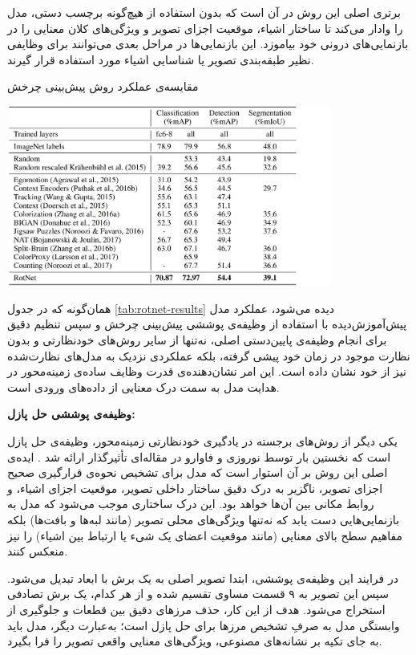 برتری اصلی این روش در آن است که بدون استفاده از هیچ‌گونه برچسب دستی، مدل را وادار می‌کند تا ساختار اشیاء، موقعیت اجزای تصویر و ویژگی‌های کلان معنایی را در بازنمایی‌های درونی خود بیاموزد. این بازنمایی‌ها در مراحل بعدی می‌توانند برای وظایفی نظیر طبقه‌بندی تصویر یا شناسایی اشیاء مورد استفاده قرار گیرند.

\begin{table}[htbp]
\centering
\caption{مقایسه‌ی عملکرد روش پیش‌بینی چرخش }
\includegraphics[width=0.8\textwidth]{Images/Chapter2/rotnet-results.png}
\label{tab:rotnet-results}
\end{table}

همان‌گونه که در جدول
\ref{tab:rotnet-results}
دیده می‌شود، عملکرد مدل پیش‌آموزش‌دیده با استفاده از وظیفه‌ی پوششی پیش‌بینی چرخش و سپس تنظیم دقیق برای انجام وظیفه‌ی پایین‌دستی اصلی، نه‌تنها از سایر روش‌های خودنظارتی و بدون نظارت موجود در زمان خود پیشی گرفته، بلکه عملکردی نزدیک به مدل‌های نظارت‌شده نیز از خود نشان داده است. این امر نشان‌دهنده‌ی قدرت وظایف ساده‌ی زمینه‌محور در هدایت مدل به سمت درک معنایی از داده‌های ورودی است.\newline

\noindent\textbf{وظیفه‌ی پوششی حل پازل:}

یکی دیگر از روش‌های برجسته در یادگیری خودنظارتی زمینه‌محور، وظیفه‌ی حل پازل است که نخستین بار توسط نوروزی و فاوارو در مقاله‌ای تأثیرگذار ارائه شد \cite{noroozi2016unsupervised}. ایده‌ی اصلی این روش بر آن استوار است که مدل برای تشخیص نحوه‌ی قرارگیری صحیح اجزای تصویر، ناگزیر به درک دقیق ساختار داخلی تصویر، موقعیت اجزای اشیاء، و روابط مکانی بین آن‌ها خواهد بود. این درک ساختاری موجب می‌شود که مدل به بازنمایی‌هایی دست یابد که نه‌تنها ویژگی‌های محلی تصویر (مانند لبه‌ها و بافت‌ها) بلکه مفاهیم سطح بالای معنایی (مانند موقعیت اعضای یک شیء یا ارتباط بین اشیاء) را نیز منعکس کنند.

در فرایند این وظیفه‌ی پوششی، ابتدا تصویر اصلی به یک برش با ابعاد  تبدیل می‌شود. سپس این تصویر به ۹ قسمت مساوی  تقسیم شده و از هر کدام، یک برش تصادفی  استخراج می‌شود. هدف از این کار، حذف مرزهای دقیق بین قطعات و جلوگیری از وابستگی مدل به صرفِ تشخیص مرزها برای حل پازل است؛ به‌عبارت دیگر، مدل باید به جای تکیه بر نشانه‌های مصنوعی، ویژگی‌های معنایی واقعی تصویر را فرا بگیرد.

